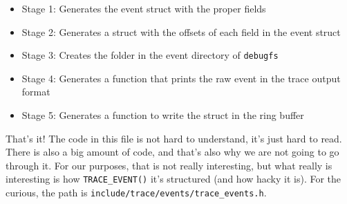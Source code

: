 \begin{itemize}
    \item Stage 1: Generates the event struct with the proper fields
    \item Stage 2: Generates a struct with the offsets of each field in the event struct
    \item Stage 3: Creates the folder in the event directory of \verb|debugfs|
    \item Stage 4: Generates a function that prints the raw event in the trace output format
    \item Stage 5: Generates a function to write the struct in the ring buffer
\end{itemize}
That's it! The code in this file is not hard to understand, it's just hard to read. There is also a big amount of code, and that's also why we are not going to go through it. For our purposes, that is not really interesting, but what really is interesting is how \verb|TRACE_EVENT()| it's structured (and how hacky it is). For the curious, the path is \verb|include/trace/events/trace_events.h|.

